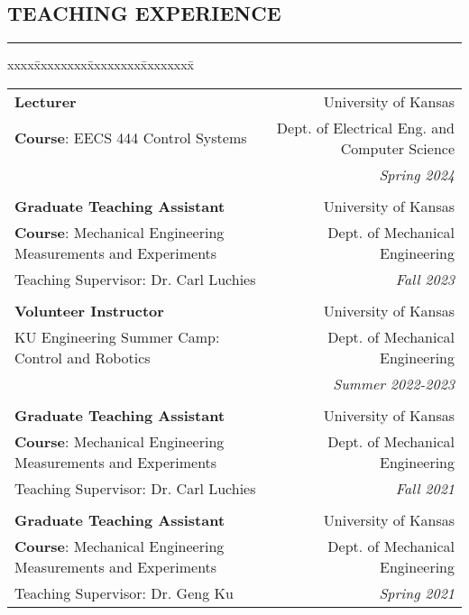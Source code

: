 \documentclass[10pt,letter]{article}
\begin{document}
\begin{small}
\subsection*{TEACHING EXPERIENCE}
\hrule
\vspace{0.2cm}

\begin{tabbing}
xxxx\=xxxxxxxx\=xxxxxxxx\=xxxxxxxx\=\kill

\>\begin{tabular*}{0.9\linewidth}{l@{\extracolsep{\fill}}r}
\textbf{Lecturer} & University of Kansas \\
\textbf{Course}: EECS 444 Control Systems  & Dept. of Electrical Eng. and Computer Science\\
 & {\it Spring 2024}\\ 
 & \vspace{-5pt}\\

\textbf{Graduate Teaching Assistant} & University of Kansas \\
\textbf{Course}: Mechanical Engineering Measurements and Experiments & Dept. of Mechanical Engineering\\
Teaching Supervisor: Dr. Carl Luchies & {\it Fall 2023}\\ 
 & \vspace{-5pt}\\

\textbf{Volunteer Instructor} & University of Kansas \\
KU Engineering Summer Camp: Control and Robotics  & Dept. of Mechanical Engineering\\
& {\it Summer 2022-2023}\\ 
 & \vspace{-5pt}\\

\textbf{Graduate Teaching Assistant} & University of Kansas \\
\textbf{Course}: Mechanical Engineering Measurements and Experiments & Dept. of Mechanical Engineering\\
Teaching Supervisor: Dr. Carl Luchies & {\it Fall 2021}\\ 
 & \vspace{-5pt}\\

\textbf{Graduate Teaching Assistant} & University of Kansas \\
\textbf{Course}: Mechanical Engineering Measurements and Experiments & Dept. of Mechanical Engineering\\
Teaching Supervisor: Dr. Geng Ku& {\it Spring 2021}\\ 
\end{tabular*}
\end{tabbing}


\end{small}
\end{document}
